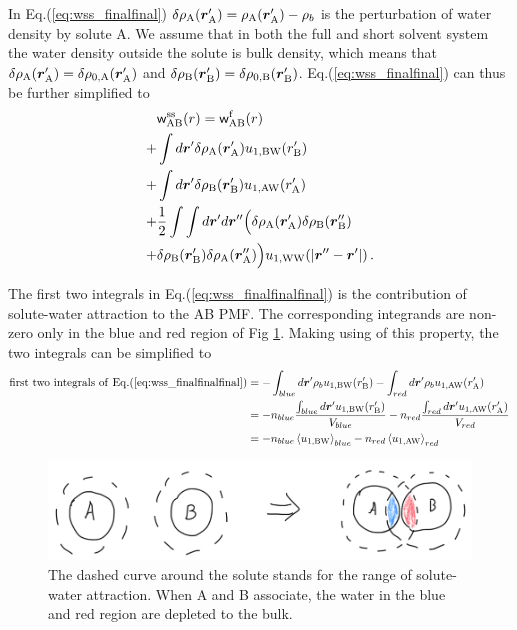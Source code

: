 \documentclass[9pt]{article}
\renewcommand{\vec}[1]{\mbox{\boldmath$#1$}}
\newcommand{\A}{\mathrm{A}}
\newcommand{\W}{\mathrm{W}}
\newcommand{\B}{\mathrm{B}}
\newcommand{\f}{\mathrm{f}}
\newcommand{\sss}{\mathrm{ss}}
\newcommand{\w}{\mathsf{w}}
\begin{document}
In Eq.(\ref{eq:wss_finalfinal}) $\delta \rho_{\A}(\vec{r}_{\A}') = \rho_{\A}(\vec{r}_{\A}') - \rho_b$ is the perturbation of water density by solute A. We assume that in both the full and short solvent system the water density outside the solute is bulk density, which means that $\delta \rho_{\A}(\vec{r}_{\A}') = \delta \rho_{0, \A}(\vec{r}_{\A}') $ and $\delta \rho_{\B}(\vec{r}_{\B}') = \delta \rho_{0, \B}(\vec{r}_{\B}') $. Eq.(\ref{eq:wss_finalfinal}) can thus be further simplified to
 \begin{align}
\begin{split}
 & \w_{\A\B}^{\sss}(r) =  \w_{\A\B}^{\f}(r) \\
+ & \int d \vec{r}'\delta \rho_{\A}(\vec{r}_{\A}') u_{1,\B\W}(r_{\B}') \\
 +&  \int d \vec{r}'\delta \rho_{\B}(\vec{r}_{\B}') u_{1,\A\W}(r_{\A}') \\
 + &  \frac{1}{2} \int \int d \vec{r}' d \vec{r}'' \Big( \delta \rho_{\A}(\vec{r}_{\A}') \delta \rho_{\B}(\vec{r}_{\B}'') \\
 + & \delta \rho_{\B}(\vec{r}_{\B}') \delta \rho_{\A}(\vec{r}_{\A}'') \Big) u_{1,\W\W}(|\vec{r}'' - \vec{r}'|) \,.
\end{split}
\label{eq:wss_finalfinalfinal}
\end{align}

The first two integrals in Eq.(\ref{eq:wss_finalfinalfinal}) is the contribution of solute-water attraction to the AB PMF. The corresponding integrands are non-zero only in the blue and red region of Fig \ref{fig:sw}. Making using of this property, the two integrals can be simplified to
 \begin{align}
\begin{split}
\mathrm{first\,\, two\,\, integrals\,\, of\,\, Eq.(\ref{eq:wss_finalfinalfinal})} & = -\int_{blue}d \vec{r}' \rho_b u_{1,\B\W}(r_{\B}')  -\int_{red}d \vec{r}' \rho_b u_{1,\A\W}(r_{\A}') \\
& = -n_{blue}\frac{\int_{blue}d \vec{r}' u_{1,\B\W}(r_{\B}')}{V_{blue}} -n_{red}\frac{\int_{red}d \vec{r}' u_{1,\A\W}(r_{\A}')}{V_{red}} \\
& = -n_{blue} \left\langle u_{1,\B\W} \right\rangle_{blue} - n_{red} \left\langle u_{1,\A\W} \right\rangle_{red}
\end{split}
\label{eq:wss_solutewater}
\end{align}
\begin{figure}[htp]
\centering
\includegraphics[scale=0.35]{Fig_SW.png}
\caption{The dashed curve around the solute stands for the range of solute-water attraction. When A and B associate, the water in the blue and red region are depleted to the bulk.}
\label{fig:sw}
\end{figure}
\end{document}
